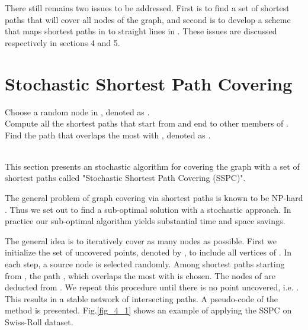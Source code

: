 \documentclass[10pt,journal,cspaper,compsoc]{IEEEtran}
\begin{document}
There still remains two issues to be addressed. First is to find a set of shortest paths  that will cover all nodes of the graph, and second is to develop a scheme that maps shortest paths in  to straight lines in . These issues are discussed respectively in sections 4 and 5. 

\section{Stochastic Shortest Path Covering}

\begin{algorithm}[b] 
 \begin{framed}
 \SetAlgoLined 
 \KwData{\\
 		 \hspace{9.5mm}}  
 \While{}
 {\vspace{1mm}
Choose a random node in , denoted as .\vspace{1mm}\\
Compute all the shortest paths that start from  and end to other members of .\vspace{1mm}\\
Find the path that overlaps the most with , denoted as .\vspace{1mm}\\
\vspace{1mm}\\
\vspace{1mm}
}  
 \end{framed}
 \vspace{-3mm}
\end{algorithm}


This section presents an stochastic algorithm for covering the graph with a set of shortest paths called "Stochastic Shortest Path Covering (SSPC)".

The general problem of graph covering via shortest paths is known to be NP-hard \cite{boothe2007graph}. Thus we set out to find a sub-optimal solution with a stochastic approach. In practice our sub-optimal algorithm yields substantial time and space savings.
 
The general idea is to iteratively cover as many nodes as possible. First we initialize the set of uncovered points, denoted by , to include all vertices of . In each step, a source node  is selected randomly. Among shortest paths starting from , the path , which overlaps the most with  is chosen. The nodes of  are deducted from . We repeat this procedure until there is no point uncovered, i.e. . This results in a stable network of intersecting paths. A pseudo-code of the method is presented. Fig.\ref{fig_4_1} shows an example of applying the SSPC on Swiss-Roll dataset.
\end{document}

